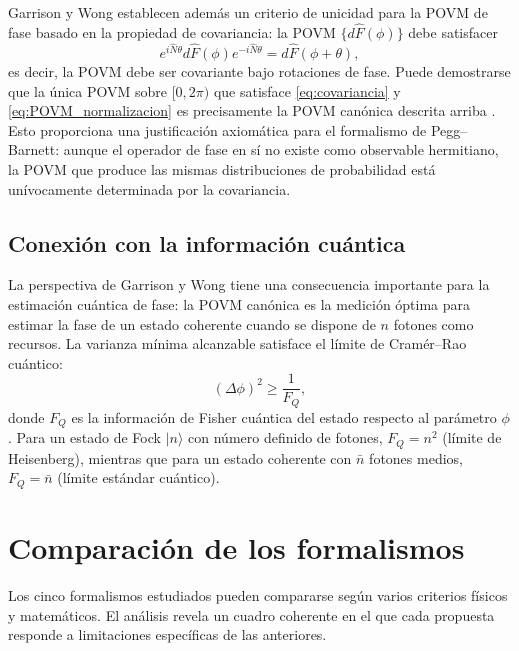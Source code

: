             Garrison y Wong establecen además un criterio de unicidad para la POVM de fase basado en la propiedad de covariancia: la POVM $\{d\hat{F}(\phi)\}$ debe satisfacer
            \begin{equation}
                e^{i\hat{N}\theta} d\hat{F}(\phi) e^{-i\hat{N}\theta} = d\hat{F}(\phi + \theta),
                \label{eq:covariancia}
            \end{equation}
            es decir, la POVM debe ser covariante bajo rotaciones de fase. Puede demostrarse que la única POVM sobre $[0, 2\pi)$ que satisface \eqref{eq:covariancia} y \eqref{eq:POVM_normalizacion} es precisamente la POVM canónica descrita arriba \cite{Holevo1982}. Esto proporciona una justificación axiomática para el formalismo de Pegg--Barnett: aunque el operador de fase en sí no existe como observable hermitiano, la POVM que produce las mismas distribuciones de probabilidad está unívocamente determinada por la covariancia.
    
        \subsection{Conexión con la información cuántica}
        
            La perspectiva de Garrison y Wong tiene una consecuencia importante para la estimación cuántica de fase: la POVM canónica es la medición óptima para estimar la fase de un estado coherente cuando se dispone de $n$ fotones como recursos. La varianza mínima alcanzable satisface el límite de Cramér--Rao cuántico:
            \begin{equation}
                (\Delta\phi)^2 \geq \frac{1}{F_Q},
                \label{eq:Cramer_Rao}
            \end{equation}
            donde $F_Q$ es la información de Fisher cuántica del estado respecto al parámetro $\phi$. Para un estado de Fock $|n\rangle$ con número definido de fotones, $F_Q = n^2$ (límite de Heisenberg), mientras que para un estado coherente con $\bar{n}$ fotones medios, $F_Q = \bar{n}$ (límite estándar cuántico).
 
    \section{Comparación de los formalismos}
    
        Los cinco formalismos estudiados pueden compararse según varios criterios físicos y matemáticos. El análisis revela un cuadro coherente en el que cada propuesta responde a limitaciones específicas de las anteriores.
        
